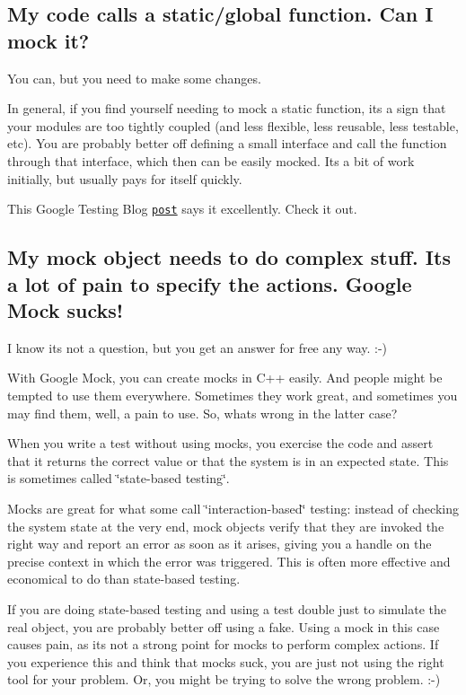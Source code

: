\subsection*{My code calls a static/global function. Can I mock it?}

You can, but you need to make some changes.

In general, if you find yourself needing to mock a static function, it\textquotesingle{}s a sign that your modules are too tightly coupled (and less flexible, less reusable, less testable, etc). You are probably better off defining a small interface and call the function through that interface, which then can be easily mocked. It\textquotesingle{}s a bit of work initially, but usually pays for itself quickly.

This Google Testing Blog \href{https://testing.googleblog.com/2008/06/defeat-static-cling.html}{\tt post} says it excellently. Check it out.

\subsection*{My mock object needs to do complex stuff. It\textquotesingle{}s a lot of pain to specify the actions. Google Mock sucks!}

I know it\textquotesingle{}s not a question, but you get an answer for free any way. \+:-\/)

With Google Mock, you can create mocks in C++ easily. And people might be tempted to use them everywhere. Sometimes they work great, and sometimes you may find them, well, a pain to use. So, what\textquotesingle{}s wrong in the latter case?

When you write a test without using mocks, you exercise the code and assert that it returns the correct value or that the system is in an expected state. This is sometimes called \char`\"{}state-\/based testing\char`\"{}.

Mocks are great for what some call \char`\"{}interaction-\/based\char`\"{} testing\+: instead of checking the system state at the very end, mock objects verify that they are invoked the right way and report an error as soon as it arises, giving you a handle on the precise context in which the error was triggered. This is often more effective and economical to do than state-\/based testing.

If you are doing state-\/based testing and using a test double just to simulate the real object, you are probably better off using a fake. Using a mock in this case causes pain, as it\textquotesingle{}s not a strong point for mocks to perform complex actions. If you experience this and think that mocks suck, you are just not using the right tool for your problem. Or, you might be trying to solve the wrong problem. \+:-\/)

